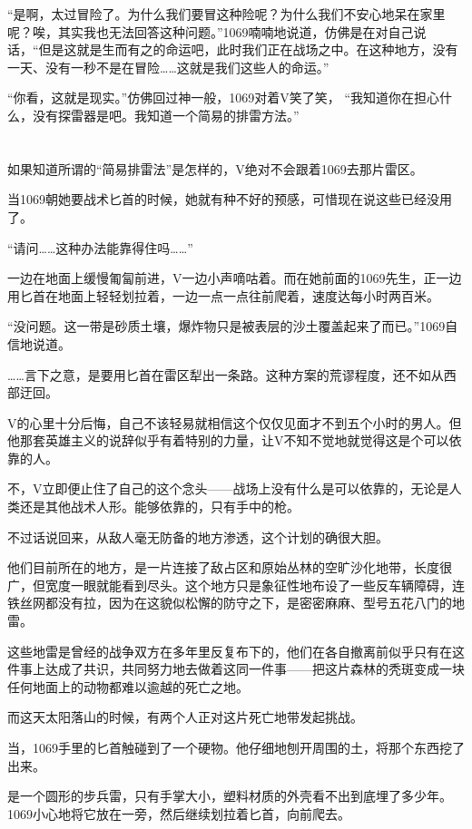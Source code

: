“是啊，太过冒险了。为什么我们要冒这种险呢？为什么我们不安心地呆在家里呢？唉，其实我也无法回答这种问题。”1069喃喃地说道，仿佛是在对自己说话，“但是这就是生而有之的命运吧，此时我们正在战场之中。在这种地方，没有一天、没有一秒不是在冒险……这就是我们这些人的命运。”

“你看，这就是现实。”仿佛回过神一般，1069对着V笑了笑， “我知道你在担心什么，没有探雷器是吧。我知道一个简易的排雷方法。”

\section*{}

如果知道所谓的“简易排雷法”是怎样的，V绝对不会跟着1069去那片雷区。

当1069朝她要战术匕首的时候，她就有种不好的预感，可惜现在说这些已经没用了。

“请问……这种办法能靠得住吗……”

一边在地面上缓慢匍匐前进，V一边小声嘀咕着。而在她前面的1069先生，正一边用匕首在地面上轻轻划拉着，一边一点一点往前爬着，速度达每小时两百米。

“没问题。这一带是砂质土壤，爆炸物只是被表层的沙土覆盖起来了而已。”1069自信地说道。

……言下之意，是要用匕首在雷区犁出一条路。这种方案的荒谬程度，还不如从西部迂回。

V的心里十分后悔，自己不该轻易就相信这个仅仅见面才不到五个小时的男人。但他那套英雄主义的说辞似乎有着特别的力量，让V不知不觉地就觉得这是个可以依靠的人。

不，V立即便止住了自己的这个念头——战场上没有什么是可以依靠的，无论是人类还是其他战术人形。能够依靠的，只有手中的枪。

不过话说回来，从敌人毫无防备的地方渗透，这个计划的确很大胆。

他们目前所在的地方，是一片连接了敌占区和原始丛林的空旷沙化地带，长度很广，但宽度一眼就能看到尽头。这个地方只是象征性地布设了一些反车辆障碍，连铁丝网都没有拉，因为在这貌似松懈的防守之下，是密密麻麻、型号五花八门的地雷。

这些地雷是曾经的战争双方在多年里反复布下的，他们在各自撤离前似乎只有在这件事上达成了共识，共同努力地去做着这同一件事——把这片森林的秃斑变成一块任何地面上的动物都难以逾越的死亡之地。

而这天太阳落山的时候，有两个人正对这片死亡地带发起挑战。

当，1069手里的匕首触碰到了一个硬物。他仔细地刨开周围的土，将那个东西挖了出来。

是一个圆形的步兵雷，只有手掌大小，塑料材质的外壳看不出到底埋了多少年。1069小心地将它放在一旁，然后继续划拉着匕首，向前爬去。

